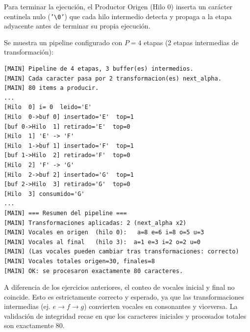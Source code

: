 \documentclass[a4paper, 12pt]{article}
\newcommand{\ic}[1]{\texttt{#1}}
\begin{document}
Para terminar la ejecución, el Productor Origen (Hilo 0) inserta un carácter centinela nulo (\ic{'\textbackslash 0'}) que cada hilo intermedio detecta y propaga a la etapa adyacente antes de terminar su propia ejecución.

Se muestra un pipeline configurado con $P=4$ etapas (2 etapas intermedias de transformación):

\begin{lstlisting}[style=shellstyle]
[MAIN] Pipeline de 4 etapas, 3 buffer(es) intermedios.
[MAIN] Cada caracter pasa por 2 transformacion(es) next_alpha.
[MAIN] 80 items a producir.
...
[Hilo  0] i= 0  leido='E'
[Hilo  0->buf 0] insertado='E'  top=1
[buf 0->Hilo  1] retirado='E'  top=0
[Hilo  1] 'E' -> 'F'
[Hilo  1->buf 1] insertado='F'  top=1
[buf 1->Hilo  2] retirado='F'  top=0
[Hilo  2] 'F' -> 'G'
[Hilo  2->buf 2] insertado='G'  top=1
[buf 2->Hilo  3] retirado='G'  top=0
[Hilo  3] consumido='G'
...
[MAIN] === Resumen del pipeline ===
[MAIN] Transformaciones aplicadas: 2 (next_alpha x2)
[MAIN] Vocales en origen  (hilo 0):   a=8 e=6 i=8 o=5 u=3
[MAIN] Vocales al final   (hilo 3):  a=1 e=3 i=2 o=2 u=0
[MAIN] (Las vocales pueden cambiar tras transformaciones: correcto)
[MAIN] Vocales totales origen=30, finales=8
[MAIN] OK: se procesaron exactamente 80 caracteres.
\end{lstlisting}

\begin{warnbox}
  A diferencia de los ejercicios anteriores, el conteo de vocales inicial y final no coincide. Esto es estrictamente correcto y esperado, ya que las transformaciones intermedias (ej. $e \rightarrow f \rightarrow g$) convierten vocales en consonantes y viceversa. La validación de integridad recae en que los caracteres iniciales y procesados totales son exactamente 80.
\end{warnbox}
\end{document}
